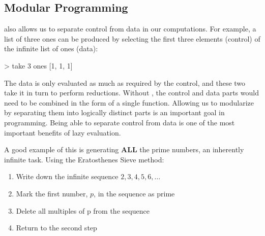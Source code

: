 \subsection{Modular Programming}\label{subsec:Modular_Programming}
 also allows us to separate control from data in our computations.
For example, a list of three ones can be produced by selecting the first three elements (control) of the infinite list of ones (data):
\begin{haskellsource}
> take 3 ones
[1, 1, 1]
\end{haskellsource}

The data is only evaluated as much as required by the control, and these two take it in turn to perform reductions.
Without , the control and data parts would need to be combined in the form of a single function.
Allowing us to modularize by separating them into logically distinct parts is an important goal in programming.
Being able to separate control from data is one of the most important benefits of lazy evaluation.

A good example of this is generating \textbf{ALL} the prime numbers, an inherently infinite task.
Using the Eratosthenes Sieve method:
\begin{enumerate}[noitemsep]
\item Write down the infinite sequence $2, 3, 4, 5, 6, \ldots$
\item Mark the first number, $p$, in the sequence as prime
\item Delete all multiples of p from the sequence
\item Return to the second step
\end{enumerate}


